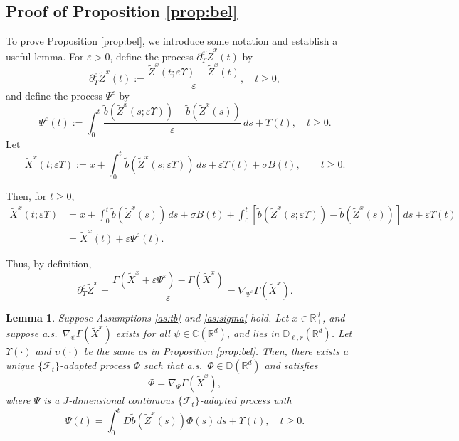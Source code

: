 \documentclass[11pt]{article}
\theoremstyle{definition}
\theoremstyle{plain}
\newtheorem{lemma}[assumption]{Lemma}
\newcommand{\C}{\mathbb{C}}
\newcommand{\D}{\mathbb{D}}
\newcommand{\tb}{\tilde{b}}
\newcommand{\veps}{\varepsilon}
\begin{document}
\begin{appendices}
\subsection{Proof of Proposition \ref{prop:bel}}
To prove Proposition \ref{prop:bel}, we introduce some notation and establish a useful lemma. 
For $\veps > 0$, define the process \( \partial_\Upsilon^\varepsilon \tilde{Z}^x(t) \) by
\begin{equation}\label{eq:deriv-eps-M}
\partial_\Upsilon^\varepsilon \tilde{Z}^x(t) := \frac{\tilde{Z}^x(t; \varepsilon \Upsilon) - \tilde{Z}^x(t)}{\varepsilon}, \quad t \ge 0,
\end{equation}
and define the process \( {\Psi}^\varepsilon \) by
\begin{equation}\label{eq:Psi-eps-M}
{\Psi}^\varepsilon(t) := \int_0^t \frac{\tb(\tilde{Z}^x(s; \varepsilon \Upsilon)) - \tb(\tilde{Z}^x(s))}{\varepsilon}\,ds + \Upsilon(t), \quad t \ge 0.
\end{equation}
Let
\begin{equation}\label{eq:X-eps-M}
\tilde{X}^x(t; \varepsilon \Upsilon) := x + \int_0^t \tb(\tilde{Z}^x(s; \varepsilon \Upsilon))\,ds + \varepsilon \Upsilon(t) + \sigma B(t), \qquad t \ge 0.
\end{equation}

Then, for $t \ge 0$, 
\begin{align*}
\tilde{X}^x(t; \varepsilon \Upsilon)
&= x + \int_0^t \tb(\tilde{Z}^x(s))\,ds + \sigma B(t) + \int_0^t \left[ \tb(\tilde{Z}^x(s; \varepsilon \Upsilon)) - \tb(\tilde{Z}^x(s)) \right]\,ds + \varepsilon \Upsilon(t) \\
&= \tilde{X}^x(t) + \varepsilon {\Psi}^\varepsilon(t).
\end{align*}

Thus, by definition,
\[
\partial_\Upsilon^\varepsilon \tilde{Z}^x = \frac{\Gamma(\tilde{X}^x + \varepsilon {\Psi}^\varepsilon) - \Gamma(\tilde{X}^x)}{\varepsilon}
= \nabla_{{\Psi}^\varepsilon} \Gamma(\tilde{X}^x).
\]

\begin{lemma}\label{lem:bel}
Suppose Assumptions \ref{as:tb} and \ref{as:sigma} hold.  
Let \( x \in \mathbb{R}_+^d \), and suppose a.s.\ \( \nabla_\psi \Gamma(\tilde{X}^x) \) exists for all \( \psi \in \C(\mathbb{R}^d) \), 
and lies in \( \D_{\ell, r}(\mathbb{R}^d) \).  
Let \( \Upsilon(\cdot) \) and \( \upsilon(\cdot) \) be the same as in Proposition \ref{prop:bel}.
Then, there exists a unique \( \{\mathcal{F}_t\} \)-adapted process \( \Phi \) such that a.s.\ \( \Phi \in \D(\mathbb{R}^d) \) and satisfies
\[
\Phi = \nabla_{{\Psi}} \Gamma(\tilde{X}^x),
\]
where \( {\Psi} \) is a \( J \)-dimensional continuous \( \{\mathcal{F}_t\} \)-adapted process with
\[
{\Psi}(t) = \int_0^t D\tb(\tilde{Z}^x(s)) \Phi(s)\,ds + \Upsilon(t), \quad t\geq 0.
\]


\end{lemma}
\end{appendices}
\end{document}
